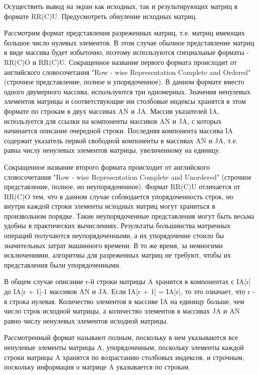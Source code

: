 Осуществить вывод на экран как исходных, так и результирующих матриц в формате RR(C)U. Предусмотреть обнуление исходных матриц.

Рассмотрим формат представления разреженных матриц, т.е. матриц имеющих большое число нулевых элементов. В этом случае обычное представление матриц в виде массива будет избыточно, поэтому используются специальные форматы - RR(C)O и RR(C)U.  Сокращенное название первого формата происходит от английского словосочетания "Row - wise Representation Complete and Ordered" (строчное представление, полное и упорядоченное). В данном формате вместо одного двумерного массива, используются три одномерных. 
Значения ненулевых элементов матрицы и соответствующие им столбовые индексы хранятся в этом формате по строкам в двух массивах AN и JA. Массив указателей IA, используется для ссылки на компоненты массивов AN и JA, с которых начинается описание очередной строки. Последняя компонента массива IA содержит указатель первой свободной компоненты в массивах AN и JA, т.е. равна числу ненулевых элементов матрицы, увеличенному на единицу. 

Сокращенное название второго формата происходит от английского словосочетания "Row - wise Representation Complete and Unordered" (строчное представление, полное, но неупорядоченное). Формат RR(C)U отличается от RR(C)O тем, что в данном случае соблюдается упорядоченность строк, но внутри каждой строки элементы исходных матриц могут храниться в произвольном порядке. Такие неупорядоченные представления могут быть весьма удобны в практических вычислениях. Результаты большинства матричных операций получаются неупорядоченными, а их упорядочение стоило бы значительных затрат машинного времени. В то же время, за немногими исключениями, алгоритмы для разреженных матриц не требуют, чтобы их представления были упорядоченными.

В общем случае описание r-й строки матрицы A хранится в компонентах с IA[r] до IA[r + 1]-1 массивов AN и JA. Если IA[r + 1] = IA[r], то это означает, что r - я строка нулевая. Количество элементов в массиве IA на единицу больше, чем число строк исходной матрицы, а количество элементов в массивах JA и AN равно числу ненулевых элементов исходной матрицы. 

Рассмотренный формат называют полным, поскольку в нем указываются все ненулевые элементы матрицы A, упорядоченным, поскольку элементы каждой строки матрицы A хранятся по возрастанию столбовых индексов, и строчным, поскольку информация о матрице A указывается по строкам. 

